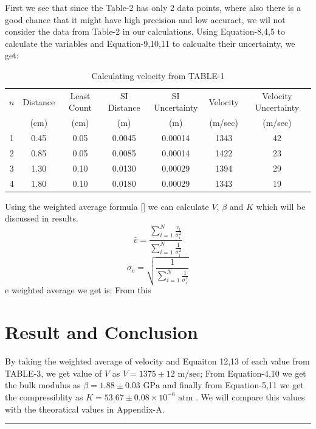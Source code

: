 \documentclass[%
sor,
 jor,
 amsmath,amssymb,
 reprint,
longbibliography,
]{revtex4-2}
\begin{document}
First we see that since the Table-2 has only 2 data points, where also there is a good chance that it might have high precision and low accuract, we wil not consider the data from Table-2 in our calculations. Using Equation-8,4,5 to calculate the variables and Equation-9,10,11 to calcualte their uncertainty, we get:
\begin{table}[H]
\centering
\begin{tabular}{c c c c c c c}
\hline
$n$ & Distance & Least Count & SI Distance & SI Uncertainty & Velocity & Velocity Uncertainty  \\
    & (cm) & (cm) & (m) & (m) & (m/sec) & (m/sec) \\
\hline
1 & 0.45 & 0.05 & 0.0045 & 0.00014 & 1343 & 42 \\
2 & 0.85 & 0.05 & 0.0085 & 0.00014 & 1422 & 23 \\
3 & 1.30 & 0.10 & 0.0130 & 0.00029 & 1394 & 29 \\
4 & 1.80 & 0.10 & 0.0180 & 0.00029 & 1343 & 19 \\
\hline
\end{tabular}

\caption{Calculating velocity from TABLE-1}
\end{table}
Using the weighted average formula [\cite{standard_error_wiki}] we can calculate $V$, $\beta$ and $K$ which will be discussed in results. 
\begin{equation}
	\bar{v}=\frac{\sum_{i=1}^{N} \frac{v_i}{\sigma_i^2}}{\sum_{i=1}^{N} \frac{1}{\sigma_i^2}}
\end{equation}
\begin{equation}
	\sigma_{\bar{v}} = \sqrt{\frac{1}{\sum_{i=1}^{N} \frac{1}{\sigma_i^2}}}
\end{equation}
e weighted average we get is: From this 

\section{Result and Conclusion}
By taking the weighted average of velocity and Equaiton 12,13 of each value from TABLE-3, we get value of $V$ as $\boxed{V = 1375 \pm 12 \text{ m/sec}}$; From Equation-4,10 we get the bulk modulus as $\boxed{\beta = 1.88 \pm 0.03 \text{ GPa}}$ and finally from Equation-5,11 we get the compressiblity as $\boxed{K = 53.67 \pm 0.08 \times 10^{-6}\text{ atm}}$ . We will compare this values with the theoratical values in Appendix-A.

\vspace{1cm}
\hrule
\vspace{1cm}
\appendix
\end{document}
